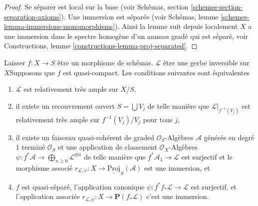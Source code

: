 \begin{proof}
Se séparer est local sur la base (voir Schémas, section \ref{schemes-section-separation-axioms}). Une immersion est séparée (voir Schémas, lemme \ref{schemes-lemma-immersions-monomorphisms}). Ainsi la lemme suit depuis localement $X$ a une immersion dans le spectre homogène d'un anneau gradé qui est séparé, voir Constructions, lemme \ref{constructions-lemma-proj-separated}.
\end{proof}

\begin{lemma}

\label{lemma-relatively-very-ample}

Laisser $f : X \to S$ être un morphisme de schémas. $\mathcal{L}$ être une gerbe inversible sur $X$Supposons que $f$ est quasi-compact. Les conditions suivantes sont équivalentes

\begin{enumerate}

\item  $\mathcal{L}$ est relativement très ample sur $X/S$,
\item il existe un recouvrement ouvert $S = \bigcup V_j$ de telle manière que $\mathcal{L}|_{f^{-1}(V_j)}$ est relativement très ample sur $f^{-1}(V_j)/V_j$ pour tous $j$,
\item il existe un faisceau quasi-cohérent de graded
$\mathcal{O}_S$-Algèbres $\mathcal{A}$ générés en degré
$1$ terminé $\mathcal{O}_S$ et une application de classement $\mathcal{O}_X$-Algèbres
$\psi : f^*\mathcal{A} \to \bigoplus_{n \geq 0} \mathcal{L}^{\otimes n}$
de telle manière que $f^*\mathcal{A}_1 \to \mathcal{L}$ est surjectif et le morphisme associé
$r_{\mathcal{L}, \psi} : X \to \underline{\text{Proj}}_S(\mathcal{A})$
est une immersion, et
\item  $f$ est quasi-séparé, l'application canonique
$\psi : f^*f_*\mathcal{L} \to \mathcal{L}$ est surjectif, et l'application associée $r_{\mathcal{L}, \psi} : X \to \mathbf{P}(f_*\mathcal{L})$
c'est une immersion.

\end{enumerate}

\end{lemma}

